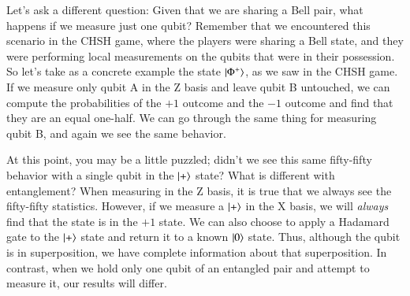 Let's ask a different question: Given that we are sharing a Bell pair, what happens if we measure just one qubit? Remember that we encountered this scenario in the CHSH game, where the players were sharing a Bell state, and they were performing local measurements on the qubits that were in their possession. So let's take as a concrete example the state $\ket{\Phi^+}$, as we saw in the CHSH game. If we measure only qubit A in the Z basis and leave qubit B untouched, we can compute the probabilities of the $+1$ outcome and the $-1$ outcome and find that they are an equal one-half.   We can go through the same thing for measuring qubit B, and again we see the same behavior.

\label{page:plus-is-pure}
At this point, you may be a little puzzled; didn't we see this same fifty-fifty behavior with a single qubit in the $\ket{+}$ state?  What is different with entanglement?  When measuring in the Z basis, it is true that we always see the fifty-fifty statistics.  However, if we measure a $\ket{+}$ in the X basis, we will \emph{always} find that the state is in the $+1$ state.  We can also choose to apply a Hadamard gate to the $\ket{+}$ state and return it to a known $\ket{0}$ state.  Thus, although the qubit is in superposition, we have complete information about that superposition.  In contrast, when we hold only one qubit of an entangled pair and attempt to measure it, our results will differ.


